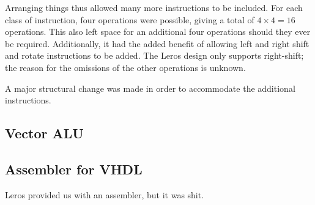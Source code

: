 Arranging things thus allowed many more instructions to be included. For each
class of instruction, four operations were possible, giving a total of
$4 \times 4 = 16$ operations. This also left space for an additional four
operations should they ever be required. Additionally, it  had the added
benefit of allowing left and
right shift and rotate instructions to be added. The Leros design only supports
right-shift; the reason for the omissions of the other operations is unknown.

A major structural change was made in order to accommodate the additional
instructions. 

\subsection{Vector ALU}
\subsection{Assembler for VHDL}

  Leros provided us with an assembler, but it was shit.
